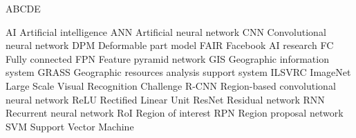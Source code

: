 
\begin{seznamzkratek}{ABCDE}

	      {AI}
	      {Artificial intelligence}
	      {ANN}
	      {Artificial neural network}
	      {CNN}
	      {Convolutional neural network}
	      {DPM}
	      {Deformable part model}
	      {FAIR}
	      {Facebook AI research}
	      {FC}
	      {Fully connected}
	      {FPN}
	      {Feature pyramid network}
	      {GIS}
	      {Geographic information system}
	      {GRASS}
	      {Geographic resources analysis support system}
	      {ILSVRC}
	      {ImageNet Large Scale Visual Recognition Challenge}
	      {R-CNN}
	      {Region-based convolutional neural network}
	      {ReLU}
	      {Rectified Linear Unit}
	      {ResNet}
	      {Residual network}
	      {RNN}
	      {Recurrent neural network}
	      {RoI}
	      {Region of interest}
	      {RPN}
	      {Region proposal network}
	      {SVM}
	      {Support Vector Machine}
	      
\end{seznamzkratek}